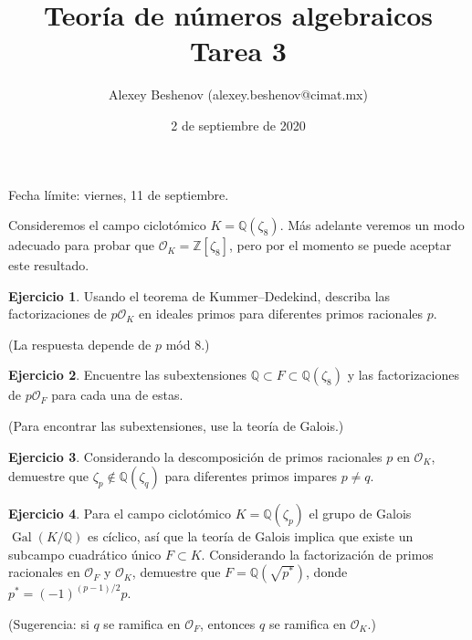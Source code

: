 \documentclass{article}
\title{Teoría de números algebraicos\\Tarea 3}
\author{Alexey Beshenov (alexey.beshenov@cimat.mx)}
\date{2 de septiembre de 2020}
\newcounter{tarea}
\theoremstyle{definition}
\newtheorem{ejercicio}{Ejercicio}[tarea]
\begin{document}
{\sffamily\bfseries\maketitle}

\noindent Fecha límite: viernes, 11 de septiembre.

\ifdefined\solutions
\else
\thispagestyle{empty}
\fi

\vspace{1em}

Consideremos el campo ciclotómico $K = \mathbb{Q} (\zeta_8)$.
Más adelante veremos un modo adecuado para probar que
$\mathcal{O}_K = \mathbb{Z}[\zeta_8]$, pero por el momento se puede aceptar este
resultado.

\begin{ejercicio}
  Usando el teorema de Kummer--Dedekind, describa las factorizaciones de
  $p \mathcal{O}_K$ en ideales primos para diferentes primos racionales $p$.

  \noindent (La respuesta depende de $p$ mód $8$.)
\end{ejercicio}

\begin{ejercicio}
  Encuentre las subextensiones
  $\mathbb{Q} \subset F \subset \mathbb{Q} (\zeta_8)$ y las factorizaciones de
  $p \mathcal{O}_F$ para cada una de estas.

  \noindent (Para encontrar las subextensiones, use la teoría de Galois.)
\end{ejercicio}

\begin{ejercicio}
  Considerando la descomposición de primos racionales $p$ en $\mathcal{O}_K$,
  demuestre que $\zeta_p \notin \mathbb{Q} (\zeta_q)$ para diferentes primos
  impares $p \ne q$.
\end{ejercicio}

\begin{ejercicio}
  Para el campo ciclotómico $K = \mathbb{Q} (\zeta_p)$ el grupo de Galois
  $\operatorname{Gal} (K/\mathbb{Q})$ es cíclico, así que la teoría de Galois
  implica que existe un subcampo cuadrático único $F \subset K$. Considerando
  la factorización de primos racionales en $\mathcal{O}_F$ y $\mathcal{O}_K$,
  demuestre que $F = \mathbb{Q} (\sqrt{p^*})$, donde $p^* = (-1)^{(p-1)/2} p$.

  \noindent (Sugerencia: si $q$ se ramifica en $\mathcal{O}_F$, entonces $q$ se
  ramifica en $\mathcal{O}_K$.)
\end{ejercicio}
\end{document}
